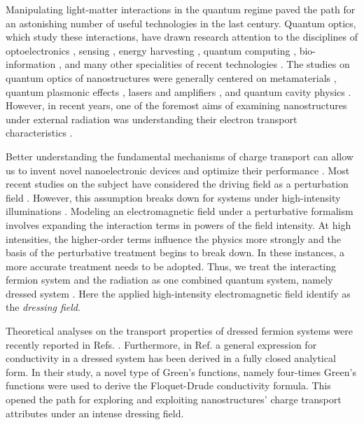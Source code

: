 
Manipulating light-matter interactions in the quantum regime paved the path for an astonishing number of useful technologies in the last century. Quantum optics, which study these interactions, have drawn research attention to the disciplines of optoelectronics \cite{liu16,wijesekara20,tao21,wijesekara21}, sensing \cite{rodrigo15,pirandola18,hapuarachchi2018}, energy harvesting \cite{weeraddana15,yuan16,sun18},
quantum computing \cite{huh15,slussarenko19,andersen21}, bio-information \cite{marais18,bian20}, and many other specialities of recent technologies \cite{rivera20}.
The studies on quantum optics of nanostructures were generally centered on metamaterials \cite{shalaev07,si14}, quantum plasmonic effects \cite{hapuarachchi19,perera20}, lasers and amplifiers \cite{chow13,jayasekara16,premaratne17}, and quantum cavity physics \cite{tsang10,liu17,devi20}.
However, in recent years, one of the foremost aims of examining nanostructures under external radiation was understanding their electron transport characteristics \cite{kitagawa11,zhou11,kibis14,pervishko15,morina15,dehghani15,dini16,wackerl20}.

Better understanding the fundamental mechanisms of charge transport can allow us to invent novel nanoelectronic devices and optimize their performance \cite{premaratne21}.
Most recent studies on the subject have considered the driving field as a perturbation field \cite{pervishko15,morina15}. However, this assumption breaks down for systems under high-intensity illuminations \cite{grifoni98,wackerl20}.
Modeling an electromagnetic field under a perturbative formalism involves expanding the interaction terms in powers of the field intensity. At high intensities, the higher-order terms influence the physics more strongly and the basis of the perturbative treatment begins to break down.
In these instances, a more accurate treatment needs to be adopted. Thus, we treat the interacting fermion system and the radiation as one combined quantum system, namely dressed system \cite{morina15,cohen98,scully01}. Here the applied high-intensity  electromagnetic field identify as the \textit{dressing field}.

Theoretical analyses on the transport properties of dressed fermion systems were recently reported in Refs. \cite{kibis14,morina15,wackerl20}.
Furthermore, in Ref. \cite{wackerl20} a general expression for conductivity in a dressed system has been derived in a fully closed analytical form. In their study, a novel type of Green’s functions, namely four-times Green’s functions were used to derive the Floquet-Drude conductivity formula. This opened the path for exploring and exploiting nanostructures' charge transport attributes under an intense dressing field.

